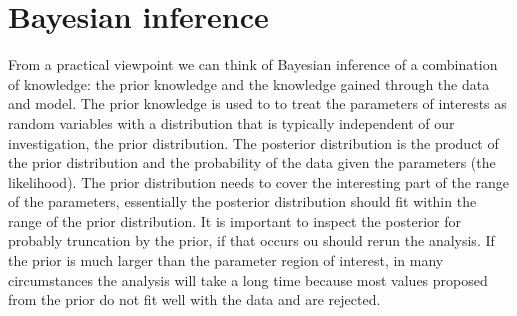 \chapter{Bayesian inference}
From a practical viewpoint we can think of Bayesian inference of a combination of knowledge: the prior knowledge and the knowledge gained through the data and model.  The prior knowledge is used to to treat the parameters of interests as random variables with a distribution that is typically independent of our investigation, the prior distribution. The posterior distribution is the product of the prior distribution and the probability of the data given the parameters (the likelihood). 
The prior distribution needs to cover the interesting part of the range of the parameters, essentially the posterior distribution should fit within the range of the prior distribution. It is important to inspect the posterior for probably truncation by the prior, if that occurs ou should rerun the analysis. If the prior is much larger than the parameter region of interest, in many circumstances the analysis will take a long time because most values proposed from the prior do not fit well with the data and are rejected. 

